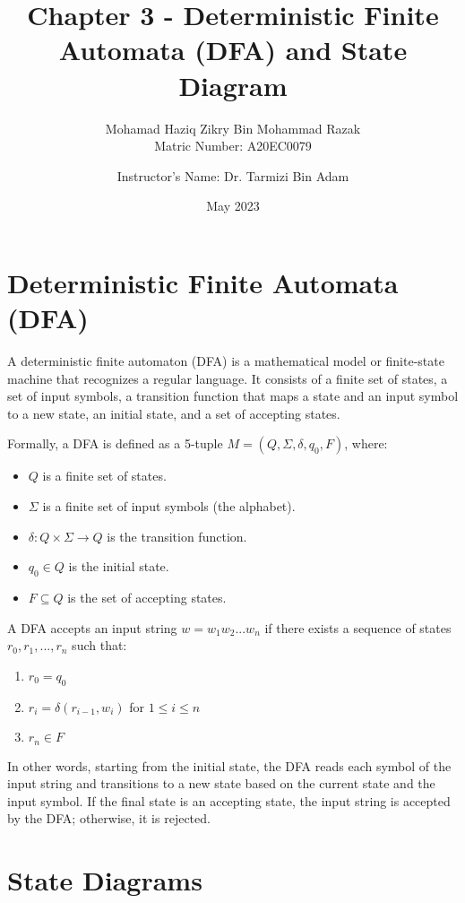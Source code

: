 \documentclass{article}
\title{Chapter 3 - Deterministic Finite Automata (DFA) and State Diagram}
\author{
  Mohamad Haziq Zikry Bin Mohammad Razak\\
  Matric Number: A20EC0079
  \and
  Instructor's Name: Dr. Tarmizi Bin Adam\\
}
\date{May 2023}
\begin{document}
\maketitle



\section{Deterministic Finite Automata (DFA)}

A deterministic finite automaton (DFA) is a mathematical model or finite-state machine that recognizes a regular language. It consists of a finite set of states, a set of input symbols, a transition function that maps a state and an input symbol to a new state, an initial state, and a set of accepting states.

Formally, a DFA is defined as a 5-tuple $M = (Q,\Sigma,\delta,q_0,F)$, where:

\begin{itemize}
\item $Q$ is a finite set of states.
\item $\Sigma$ is a finite set of input symbols (the alphabet).
\item $\delta: Q \times \Sigma \rightarrow Q$ is the transition function.
\item $q_0 \in Q$ is the initial state.
\item $F \subseteq Q$ is the set of accepting states.
\end{itemize}

A DFA accepts an input string $w = w_1w_2...w_n$ if there exists a sequence of states $r_0,r_1,...,r_n$ such that:

\begin{enumerate}
\item $r_0 = q_0$
\item $r_i = \delta(r_{i-1},w_i)$ for $1 \leq i \leq n$
\item $r_n \in F$
\end{enumerate}

In other words, starting from the initial state, the DFA reads each symbol of the input string and transitions to a new state based on the current state and the input symbol. If the final state is an accepting state, the input string is accepted by the DFA; otherwise, it is rejected.


\section{State Diagrams}
\end{document}
